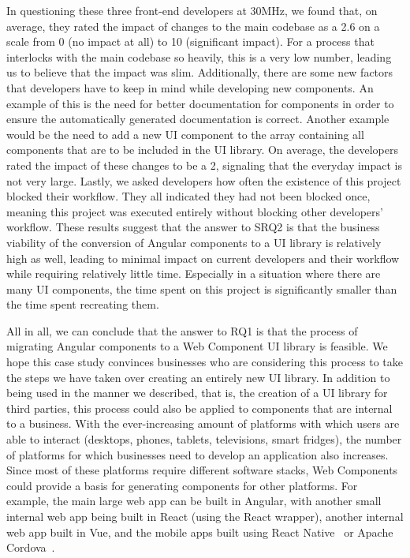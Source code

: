 In questioning these three front-end developers at 30MHz, we found that, on average, they rated the impact of changes to the main codebase as a 2.6 on a scale from 0 (no impact at all) to 10 (significant impact). For a process that interlocks with the main codebase so heavily, this is a very low number, leading us to believe that the impact was slim.
Additionally, there are some new factors that developers have to keep in mind while developing new components. An example of this is the need for better documentation for components in order to ensure the automatically generated documentation is correct. Another example would be the need to add a new UI component to the array containing all components that are to be included in the UI library. On average, the developers rated the impact of these changes to be a 2, signaling that the everyday impact is not very large. Lastly, we asked developers how often the existence of this project blocked their workflow. They all indicated they had not been blocked once, meaning this project was executed entirely without blocking other developers' workflow. These results suggest that the answer to SRQ2 is that the business viability of the conversion of Angular components to a UI library is relatively high as well, leading to minimal impact on current developers and their workflow while requiring relatively little time. Especially in a situation where there are many UI components, the time spent on this project is significantly smaller than the time spent recreating them.

All in all, we can conclude that the answer to RQ1 is that the process of migrating Angular components to a Web Component UI library is feasible. We hope this case study convinces businesses who are considering this process to take the steps we have taken over creating an entirely new UI library. In addition to being used in the manner we described, that is, the creation of a UI library for third parties, this process could also be applied to components that are internal to a business. With the ever-increasing amount of platforms with which users are able to interact (desktops, phones, tablets, televisions, smart fridges), the number of platforms for which businesses need to develop an application also increases. Since most of these platforms require different software stacks, Web Components could provide a basis for generating components for other platforms. For example, the main large web app can be built in Angular, with another small internal web app being built in React (using the React wrapper), another internal web app built in Vue, and the mobile apps built using React Native~ or Apache Cordova~.

